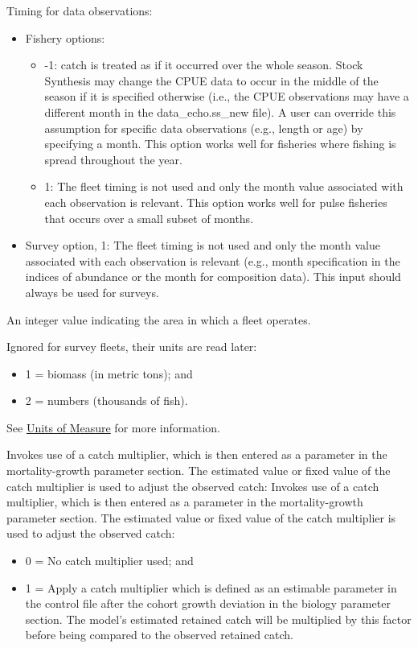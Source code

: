 \hypertarget{ObsTiming}{}
   Timing for data observations:
	  \begin{itemize}
	  	\item Fishery options:
		\begin{itemize}
		    \item -1: catch is treated as if it occurred over the whole season. Stock Synthesis may change the CPUE data to occur in the middle of the season if it is specified otherwise (i.e., the CPUE observations may have a different month in the data\_echo.ss\_new file). A user can override this assumption for specific data observations (e.g., length or age) by specifying a month. This option works well for fisheries where fishing is spread throughout the year.
			\item 1: The fleet timing is not used and only the month value associated with each observation is relevant. This option works well for pulse fisheries that occurs over a small subset of months.
		\end{itemize}
	  	\item Survey option, 1: The fleet timing is not used and only the month value associated with each observation is relevant (e.g., month specification in the indices of abundance or the month for composition data). This input should always be used for surveys.
	  \end{itemize}	  
	  
An integer value indicating the area in which a fleet operates.

  Ignored for survey fleets, their units are read later:
	  \begin{itemize}
	  	\item 1 = biomass (in metric tons); and
	  	\item 2 = numbers (thousands of fish).
	  \end{itemize}   
  See \hyperlink{UnitsOfMeasure}{Units of Measure} for more information.

\hypertarget{CatchMult}{}
Invokes use of a catch multiplier, which is then entered as a parameter in the mortality-growth parameter section. The estimated value or fixed value of the catch multiplier is used to adjust the observed catch:
Invokes use of a catch multiplier, which is then entered as a parameter in the mortality-growth parameter section. The estimated value or fixed value of the catch multiplier is used to adjust the observed catch:
	  \begin{itemize}
	  	\item 0 = No catch multiplier used; and
	  	\item 1 = Apply a catch multiplier which is defined as an estimable parameter in the control file after the cohort growth deviation in the biology parameter section. The model's estimated retained catch will be multiplied by this factor before being compared to the observed retained catch.
	  \end{itemize} 
	  
